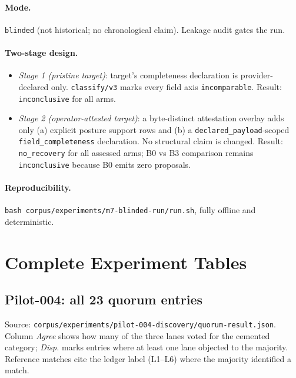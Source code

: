 \documentclass[11pt]{article}
\theoremstyle{gowthm}
\theoremstyle{gowplain}
\begin{document}
\paragraph{Mode.} \texttt{blinded} (not historical; no chronological claim).
Leakage audit gates the run.

\paragraph{Two-stage design.}
\begin{itemize}[nosep]
  \item \emph{Stage 1 (pristine target)}: target's completeness declaration is
    provider-declared only. \texttt{classify/v3} marks every field axis
    \texttt{incomparable}. Result: \texttt{inconclusive} for all arms.
  \item \emph{Stage 2 (operator-attested target)}: a byte-distinct attestation
    overlay adds only (a) explicit posture support rows and (b) a
    \texttt{declared\_payload}-scoped \texttt{field\_completeness} declaration.
    No structural claim is changed. Result: \texttt{no\_recovery} for all
    assessed arms; B0 vs B3 comparison remains \texttt{inconclusive} because
    B0 emits zero proposals.
\end{itemize}

\paragraph{Reproducibility.} \texttt{bash corpus/experiments/m7-blinded-run/run.sh},
fully offline and deterministic.

\section{Complete Experiment Tables}
\label{app:tables}

\subsection{Pilot-004: all 23 quorum entries}

Source: \texttt{corpus/experiments/pilot-004-discovery/quorum-result.json}.
Column \emph{Agree} shows how many of the three lanes voted for the cemented
category; \emph{Disp.} marks entries where at least one lane objected to the
majority. Reference matches cite the ledger label (L1--L6) where the majority
identified a match.
\end{document}
